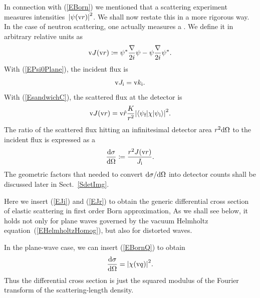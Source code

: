 In connection with (\ref{EBorn}) we mentioned
that a scattering experiment measures intensities~${|\psi(\text{v}{r})|}^2$.
We shall now restate this in a more rigorous way.
In the case of neutron scattering,
one actually measures a .
We define it in arbitrary relative units as
\begin{equation}\label{EdefJ}
  \text{v}{J}(\text{v}{r}) \coloneqq  \psi^*\frac{\mathbf{\nabla}}{2i}\psi - \psi\frac{\mathbf{\nabla}}{2i}\psi^*.
\end{equation}
%
With (\ref{EPsi0Plane}), the incident flux is
\begin{equation}\label{EJi}
  \text{v}{J}_{\text{i}} = \text{v}{k}_{\text{i}}.
\end{equation}
With (\ref{EsandwichC}), the scattered flux at the detector is
\begin{equation}\label{EJr}
  \text{v}{J}(\text{v}{r})
  = \text{v}{\hat r}\frac{K}{r^2}
    {\left|\left\langle\psi_{\text{f}}|\chi|\psi_{\text{i}}\right\rangle\right|}^2.
\end{equation}
The ratio of the scattered flux hitting an infinitesimal detector area
$r^2\text{d}\Omega$ to the incident flux is expressed as a
%
\begin{equation}
  \frac{\text{d}\sigma}{\text{d}\Omega}
  \coloneqq  \frac{r^2 J(\text{v}{r})}{J_{\text{i}}}.
\end{equation}
%
%
The geometric factors that needed to
convert $\text{d}\sigma/\text{d}\Omega$ into detector counts shall be discussed later in Sect.~\ref{SdetImg}.

Here we insert (\ref{EJi}) and (\ref{EJr}) to obtain 
the generic differential cross section of elastic scattering in first order Born approximation,
As we shall see below,
it holds not only for plane waves governed
by the vacuum Helmholtz equation~(\ref{EHelmholtzHomog}),
but also for distorted waves.

In the plane-wave case, we can insert (\ref{EBornQ}) to obtain
\begin{equation}\label{Ecross1}
  \frac{\text{d}\sigma}{\text{d}\Omega}
  = {\left| \chi(\text{v}{q}) \right|}^2.
\end{equation}
Thus the differential cross section is just the squared modulus
of the Fourier transform 
%
of the scattering-length density.

